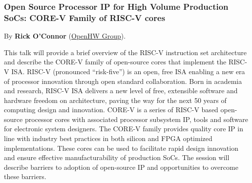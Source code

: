 \documentclass[a4paper, 10pt]{article}
\begin{document}
{\subsubsection{Open Source Processor IP for High Volume Production SoCs: CORE-V Family of RISC-V cores}
\label{sec:org95c1564}
By \textbf{Rick O'Connor} (\href{https://openhwgroup.org}{OpenHW Group}).

This talk will provide a brief overview of the RISC-V instruction set
architecture and describe the CORE-V family of open-source cores that
implement the RISC-V ISA. RISC-V (pronounced “risk-five”) is an open,
free ISA enabling a new era of processor innovation through open
standard collaboration. Born in academia and research, RISC-V ISA
delivers a new level of free, extensible software and hardware freedom
on architecture, paving the way for the next 50 years of computing
design and innovation.
CORE-V is a series of RISC-V based open-source processor cores with
associated processor subsystem IP, tools and software for electronic
system designers. The CORE-V family provides quality core IP in line
with industry best practices in both silicon and FPGA optimized
implementations. These cores can be used to facilitate rapid design
innovation and ensure effective manufacturability of production SoCs.
The session will describe barriers to adoption of open-source IP and
opportunities to overcome these barriers.

}
\end{document}
